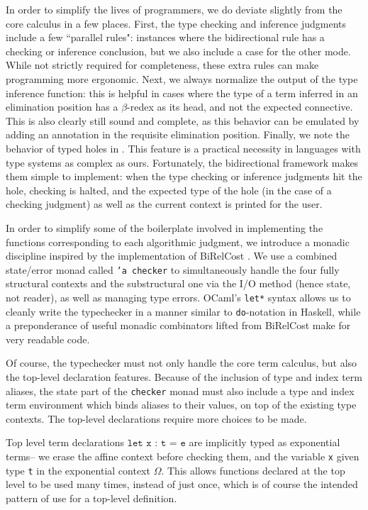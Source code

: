 In order to simplify the lives of programmers, we do deviate slightly from the core calculus in a few places. First, the type checking and inference judgments include a few ``parallel rules": instances where the bidirectional rule has a checking or inference conclusion, but we also include a case for the other mode. While not strictly required for completeness, these extra rules can make programming more ergonomic. Next, we always normalize the output of the type inference function: this is helpful in cases where the type of a term inferred in an elimination position has a $\beta$-redex as its head, and not the expected connective. This is also clearly still sound and complete, as this behavior can be emulated by adding an annotation in the requisite elimination position. Finally, we note the behavior of typed holes in \lambdaamorimpl. This feature is a practical necessity in languages with type systems as complex as ours. Fortunately, the bidirectional framework makes them simple to implement: when the type checking or inference judgments hit the hole, checking is halted, and the expected type of the hole (in the case of a checking judgment) as well as the current context is printed for the user.

In order to simplify some of the boilerplate involved in implementing the functions corresponding to each algorithmic judgment, we introduce a monadic discipline inspired by the implementation of BiRelCost \citehere. We use a combined state/error monad called \texttt{'a checker} to simultaneously handle the four fully structural contexts and the substructural one via the I/O method (hence state, not reader), as well as managing type errors. OCaml's \texttt{let*} syntax allows us to cleanly write the typechecker in a manner similar to \texttt{do}-notation in Haskell, while a preponderance of useful monadic combinators lifted from BiRelCost make for very readable code.

Of course, the typechecker must not only handle the core term calculus, but also the top-level declaration features. Because of the inclusion of type and index term aliases, the state part of the \texttt{checker} monad must also include a type and index term environment which binds aliases to their values, on top of the existing type contexts. The top-level declarations require more choices to be made. 

Top level term declarations $\texttt{let x : t = e}$ are implicitly typed as exponential terms-- we erase the affine context before checking them, and the variable \texttt{x} given type \texttt{t} in the exponential context $\Omega$. This allows functions declared at the top level to be used many times, instead of just once, which is of course the intended pattern of use for a top-level definition.

